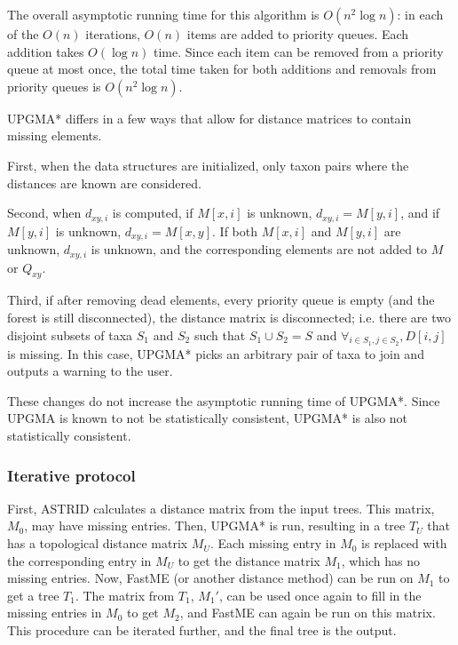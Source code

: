 The overall asymptotic running time for this algorithm is $O(n^2\log n)$: in each of the $O(n)$ iterations, $O(n)$ items are added to priority queues. Each addition takes $O(\log n)$ time. Since each item can be removed from a priority queue at most once, the total time taken for both additions and removals from priority queues is $O(n^2\log n)$.

UPGMA* differs in a few ways that allow for distance matrices to contain missing elements. 

First, when the data structures are initialized, only taxon pairs where the distances are known are considered.

Second, when $d_{xy,i}$ is computed, if $M[x,i]$ is unknown, $d_{xy,i} = M[y,i]$, and if $M[y,i]$ is unknown, $d_{xy,i} = M[x, y]$. If both $M[x,i]$ and $M[y,i]$ are unknown, $d_{xy,i}$ is unknown, and the corresponding elements are not added to $M$ or $Q_{xy}$.

Third, if after removing dead elements, every priority queue is empty (and the forest is still disconnected), the distance matrix is disconnected; i.e. there are two disjoint subsets of taxa $S_1$ and $S_2$ such that $S_1 \cup S_2 = S$ and $\forall_{i \in S_1, j \in S_2}, D[i, j] $ is missing. In this case, UPGMA* picks an arbitrary pair of taxa to join and outputs a warning to the user.

These changes do not increase the asymptotic running time of UPGMA*. Since UPGMA is known to not be statistically consistent, UPGMA* is also not statistically consistent.

\subsubsection{Iterative protocol}

First, ASTRID calculates a distance matrix from the input trees. This matrix, $M_0$, may have missing entries. Then, UPGMA* is run, resulting in a tree $T_U$ that has a topological distance matrix $M_U$. Each missing entry in $M_0$ is replaced with the corresponding entry in $M_U$ to get the distance matrix $M_1$, which has no missing entries. Now, FastME (or another distance method) can be run on $M_1$ to get a tree $T_1$. The matrix from $T_1$, $M_1'$, can be used once again to fill in the missing entries in $M_0$ to get $M_2$, and FastME can again be run on this matrix. This procedure can be iterated further, and the final tree is the output.

